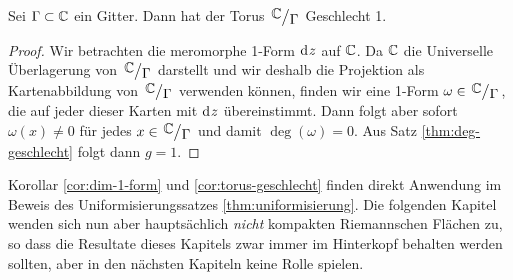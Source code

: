 \begin{cor}
  \label{cor:torus-geschlecht}
  Sei $\Gamma \subset \mathbb{C}$ ein Gitter. Dann hat der Torus
  $\quot{\C}{\Gamma}$ Geschlecht 1.
\end{cor}

\begin{proof}
  Wir betrachten die meromorphe 1-Form $\d[z]$ auf $\mathbb{C}$. Da $\mathbb{C}$ die
  Universelle Überlagerung von $\quot{\C}{\Gamma}$ darstellt und wir
  deshalb die Projektion als Kartenabbildung von $\quot{\C}{\Gamma}$
  verwenden können, finden wir eine 1-Form $\omega \in
  \quot{\C}{\Gamma}$, die auf jeder dieser Karten mit $\d[z]$
  übereinstimmt. Dann folgt aber sofort $\omega(x) \neq 0$ für jedes $x
  \in \quot{\C}{\Gamma}$ und damit $\deg(\omega) = 0$. Aus Satz
  \ref{thm:deg-geschlecht} folgt dann $g = 1$.
\end{proof}


Korollar \ref{cor:dim-1-form} und \ref{cor:torus-geschlecht} finden
direkt Anwendung im Beweis des Uniformisierungssatzes
\ref{thm:uniformisierung}. Die folgenden Kapitel wenden sich nun aber
hauptsächlich \emph{nicht} kompakten Riemannschen Flächen zu, so dass
die Resultate dieses Kapitels zwar immer im Hinterkopf behalten werden
sollten, aber in den nächsten Kapiteln keine Rolle spielen.


